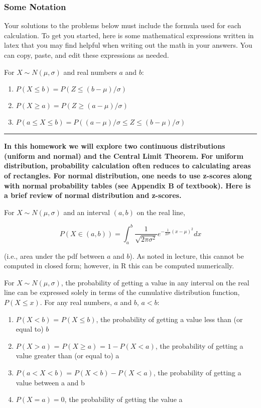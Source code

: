 \documentclass[]{article}
\providecommand{\tightlist}{%
  \setlength{\itemsep}{0pt}\setlength{\parskip}{0pt}}
\begin{document}
\hypertarget{some-notation}{%
\subsubsection{Some Notation}\label{some-notation}}

Your solutions to the problems below must include the formula used for
each calculation. To get you started, here is some mathematical
expressions written in latex that you may find helpful when writing out
the math in your answers. You can copy, paste, and edit these
expressions as needed.

For \(X \sim N(\mu, \sigma)\) and real numbers \(a\) and \(b\):

\begin{enumerate}
\def\labelenumi{\arabic{enumi})}
\tightlist
\item
  \(P(X \leq b) = P(Z \leq (b-\mu)/\sigma)\)
\item
  \(P(X \geq a) = P(Z \geq (a-\mu)/\sigma)\)
\item
  \(P(a \leq X \leq b) = P((a-\mu)/\sigma \leq Z \leq (b-\mu)/\sigma)\)
\end{enumerate}

\begin{center}\rule{0.5\linewidth}{\linethickness}\end{center}

\textbf{In this homework we will explore two continuous distributions
(uniform and normal) and the Central Limit Theorem. For uniform
distribution, probability calculation often reduces to calculating areas
of rectangles. For normal distribution, one needs to use z-scores along
with normal probability tables (see Appendix B of textbook). Here is a
brief review of normal distribution and z-scores. }

For \(X\sim N(\mu,\sigma)\) and an interval \((a,b)\) on the real line,

\[P(X \in (a,b)) = \int_{a}^{b} \frac{1}{\sqrt{2\pi\sigma^2}}e^{-\frac{1}{2\sigma^2}(x-\mu)^2}dx\]

(i.e., area under the pdf between \(a\) and \(b\)). As noted in lecture,
this cannot be computed in closed form; however, in R this can be
computed numerically.

For \(X \sim N(\mu, \sigma)\), the probability of getting a value in any
interval on the real line can be expressed solely in terms of the
cumulative distribution function, \(P(X \leq x)\). For any real numbers,
\(a\) and \(b\), \(a < b\):

\begin{enumerate}
\def\labelenumi{\arabic{enumi}.}
\item
  \(P(X < b)\) = \(P(X \leq b)\), the probability of getting a value
  less than (or equal to) \(b\)
\item
  \(P(X > a)\) = \(P(X \geq a)\) = \(1 - P(X < a)\), the probability of
  getting a value greater than (or equal to) a
\item
  \(P(a < X < b)\) = \(P(X < b) - P(X < a)\), the probability of getting
  a value between a and b
\item
  \(P(X = a) = 0\), the probability of getting the value a
\end{enumerate}
\end{document}
